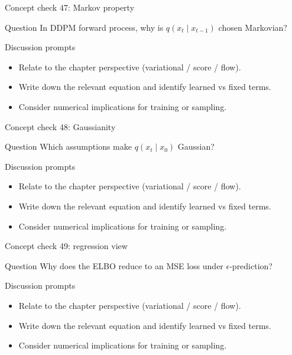 \documentclass[aspectratio=169]{beamer}
\begin{document}
\begin{frame}{Concept check 47: Markov property}
\begin{block}{Question}
In DDPM forward process, why is \(q(x_t\mid x_{t-1})\) chosen Markovian?
\end{block}
\begin{block}{Discussion prompts}
\begin{itemize}
\item Relate to the chapter perspective (variational / score / flow).
\item Write down the relevant equation and identify learned vs fixed terms.
\item Consider numerical implications for training or sampling.
\end{itemize}
\end{block}
\end{frame}

\begin{frame}{Concept check 48: Gaussianity}
\begin{block}{Question}
Which assumptions make \(q(x_t\mid x_0)\) Gaussian?
\end{block}
\begin{block}{Discussion prompts}
\begin{itemize}
\item Relate to the chapter perspective (variational / score / flow).
\item Write down the relevant equation and identify learned vs fixed terms.
\item Consider numerical implications for training or sampling.
\end{itemize}
\end{block}
\end{frame}

\begin{frame}{Concept check 49: regression view}
\begin{block}{Question}
Why does the ELBO reduce to an MSE loss under \(\epsilon\)-prediction?
\end{block}
\begin{block}{Discussion prompts}
\begin{itemize}
\item Relate to the chapter perspective (variational / score / flow).
\item Write down the relevant equation and identify learned vs fixed terms.
\item Consider numerical implications for training or sampling.
\end{itemize}
\end{block}
\end{frame}
\end{document}
